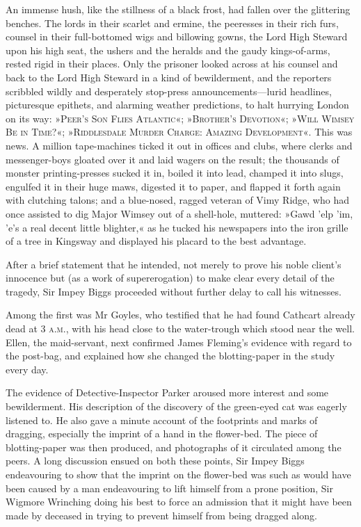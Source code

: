 An immense hush, like the stillness of a black frost, had fallen over the glittering benches. The lords in their scarlet and ermine, the peeresses in their rich furs, counsel in their full-bottomed wigs and billowing gowns, the Lord High Steward upon his high seat, the ushers and the heralds and the gaudy kings-of-arms, rested rigid in their places. Only the prisoner looked across at his counsel and back to the Lord High Steward in a kind of bewilderment, and the reporters scribbled wildly and desperately stop-press announcements\allowbreak---\allowbreak lurid headlines, picturesque epithets, and alarming weather predictions, to halt hurrying London on its way: »\textsc{Peer's Son Flies Atlantic}«; »\textsc{Brother's Devotion}«; »\textsc{Will Wimsey Be in Time?}«; »\textsc{Riddlesdale Murder Charge: Amazing Development}«. This was news. A million tape-machines ticked it out in offices and clubs, where clerks and messenger-boys gloated over it and laid wagers on the result; the thousands of monster printing-presses sucked it in, boiled it into lead, champed it into slugs, engulfed it in their huge maws, digested it to paper, and flapped it forth again with clutching talons; and a blue-nosed, ragged veteran of Vimy Ridge, who had once assisted to dig Major Wimsey out of a shell-hole, muttered: »Gawd 'elp 'im, 'e's a real decent little blighter,« as he tucked his newspapers into the iron grille of a tree in Kingsway and displayed his placard to the best advantage.

After a brief statement that he intended, not merely to prove his noble client's innocence but (as a work of supererogation) to make clear every detail of the tragedy, Sir Impey Biggs proceeded without further delay to call his witnesses.

Among the first was Mr Goyles, who testified that he had found Cathcart already dead at 3 \textsc{a.m.}, with his head close to the water-trough which stood near the well. Ellen, the maid-servant, next confirmed James Fleming's evidence with regard to the post-bag, and explained how she changed the blotting-paper in the study every day.

The evidence of Detective-Inspector Parker aroused more interest and some bewilderment. His description of the discovery of the green-eyed cat was eagerly listened to. He also gave a minute account of the footprints and marks of dragging, especially the imprint of a hand in the flower-bed. The piece of blotting-paper was then produced, and photographs of it circulated among the peers. A long discussion ensued on both these points, Sir Impey Biggs endeavouring to show that the imprint on the flower-bed was such as would have been caused by a man endeavouring to lift himself from a prone position, Sir Wigmore Wrinching doing his best to force an admission that it might have been made by deceased in trying to prevent himself from being dragged along.

